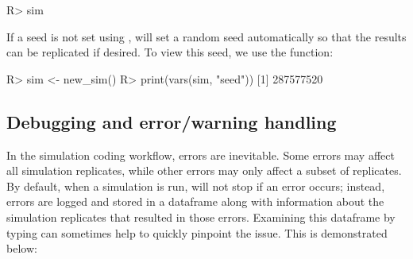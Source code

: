 \begin{example}
R> sim %
\end{example}

If a seed is not set using ,  will set a random seed automatically so that the results can be replicated if desired. To view this seed, we use the  function:

\begin{example}
R> sim <- new_sim()
R> print(vars(sim, "seed"))
[1] 287577520
\end{example}

\subsection{Debugging and error/warning handling}

In the simulation coding workflow, errors are inevitable. Some errors may affect all simulation replicates, while other errors may only affect a subset of replicates. By default, when a simulation is run,  will not stop if an error occurs; instead, errors are logged and stored in a dataframe along with information about the simulation replicates that resulted in those errors. Examining this dataframe by typing  can sometimes help to quickly pinpoint the issue. This is demonstrated below:


